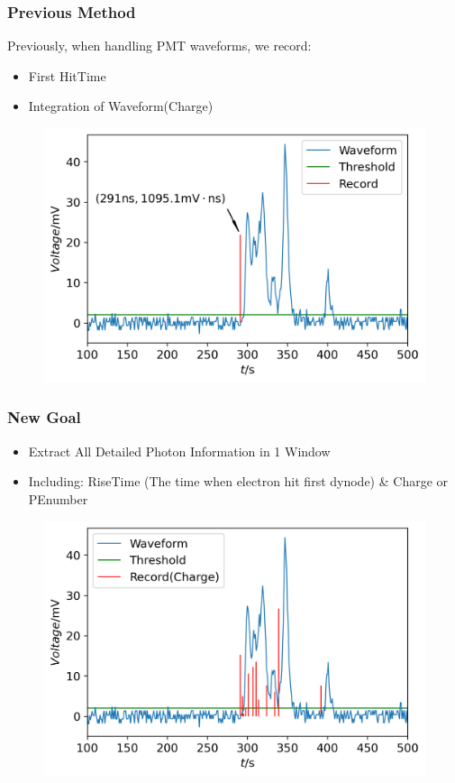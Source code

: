 \documentclass[handout]{beamer}
\begin{document}
\begin{frame}
\frametitle{Previous Method}
\hspace{4mm}Previously, when handling PMT waveforms, we record:
\begin{itemize}
    \item First HitTime
    \item Integration of Waveform(Charge)
\end{itemize}
\begin{figure}
    \centering
    \includegraphics[width=0.8\linewidth]{img/previous.png}
\end{figure}
\end{frame}

\begin{frame}
\frametitle{New Goal}
\begin{itemize}
    \item Extract All Detailed Photon Information in 1 Window
    \item Including: RiseTime (The time when electron hit first dynode) \& Charge or PEnumber
\end{itemize}
\begin{figure}
    \centering
    \includegraphics[width=0.8\linewidth]{img/goal.png}
\end{figure}
\end{frame}
\end{document}

